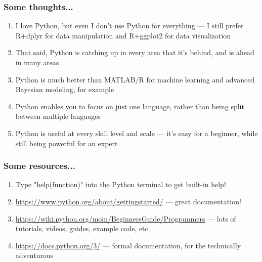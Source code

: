 \documentclass{beamer}
\begin{document}
\begin{frame}
\frametitle{Some thoughts...}
	\begin{enumerate}
		\item I love Python, but even I don't use Python for everything --- I still prefer R+dplyr for data manipulation and R+ggplot2 for data visualization

		\item That said, Python is catching up in every area that it's behind, and is ahead in many areas

		\item Python is much better than MATLAB/R for machine learning and advanced Bayesian modeling, for example 

		\item Python enables you to focus on just one language, rather than being split between multiple languages

		\item Python is useful at every skill level and scale --- it's easy for a beginner, while still being powerful for an expert 
	\end{enumerate}
\end{frame}

\begin{frame}
\frametitle{Some resources...}
	\begin{enumerate}
		\item Type "help(function)" into the Python terminal to get built-in help!

		\item \url{https://www.python.org/about/gettingstarted/} --- great documentation!

		\item \url{https://wiki.python.org/moin/BeginnersGuide/Programmers} --- lots of tutorials, videos, guides, example code, etc.

		\item \url{https://docs.python.org/3/} --- formal documentation, for the technically adventurous
	\end{enumerate}
\end{frame}
\end{document}
